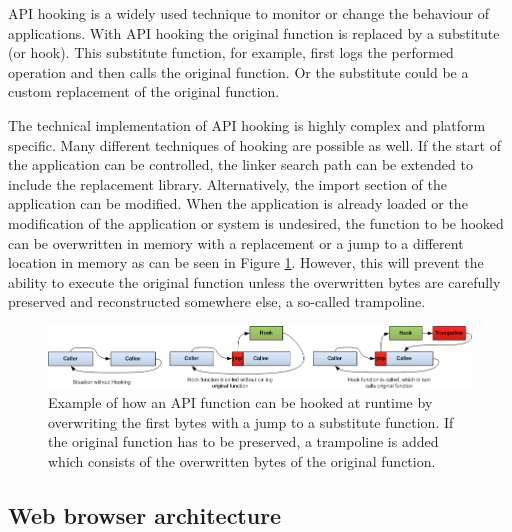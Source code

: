 API hooking is a widely used technique to monitor or change the behaviour of applications. With API hooking the original function is replaced by a substitute (or hook). This substitute function, for example, first logs the performed operation and then calls the original function. Or the substitute could be a custom replacement of the original function.

The technical implementation of API hooking is highly complex and platform specific. Many different techniques \cite{jbremer2012} of hooking are possible as well. If the start of the application can be controlled, the linker search path can be extended to include the replacement library. Alternatively, the import section of the application can be modified. When the application is already loaded or the modification of the application or system is undesired, the function to be hooked can be overwritten in memory with a replacement or a jump to a different location in memory as can be seen in Figure \ref{fig:apihooking}. However, this will prevent the ability to execute the original function unless the overwritten bytes are carefully preserved and reconstructed somewhere else, a so-called trampoline.

\begin{figure}
    \centering
    \includegraphics[width=14.7cm]{Images/API-hooking.png}
    \caption{Example of how an API function can be hooked at runtime by overwriting the first bytes with a jump to a substitute function. If the original function has to be preserved, a trampoline is added which consists of the overwritten bytes of the original function. \cite{APIHookImage}}
    \label{fig:apihooking}
\end{figure}

\vspace{-2mm}





\subsection{Web browser architecture}

